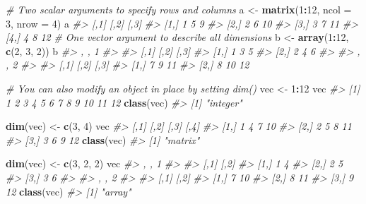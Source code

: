 \documentclass[]{book}
\newenvironment{Shaded}{\begin{snugshade}}{\end{snugshade}}
\newcommand{\CommentTok}[1]{\textcolor[rgb]{0.56,0.35,0.01}{\textit{#1}}}
\newcommand{\DataTypeTok}[1]{\textcolor[rgb]{0.13,0.29,0.53}{#1}}
\newcommand{\DecValTok}[1]{\textcolor[rgb]{0.00,0.00,0.81}{#1}}
\newcommand{\KeywordTok}[1]{\textcolor[rgb]{0.13,0.29,0.53}{\textbf{#1}}}
\newcommand{\NormalTok}[1]{#1}
\newcommand{\OperatorTok}[1]{\textcolor[rgb]{0.81,0.36,0.00}{\textbf{#1}}}
\newcommand{\StringTok}[1]{\textcolor[rgb]{0.31,0.60,0.02}{#1}}
\theoremstyle{definition}
\theoremstyle{definition}
\theoremstyle{definition}
\theoremstyle{remark}
\begin{document}
\begin{Shaded}
\begin{Highlighting}[]
\CommentTok{# Two scalar arguments to specify rows and columns}
\NormalTok{a <-}\StringTok{ }\KeywordTok{matrix}\NormalTok{(}\DecValTok{1}\OperatorTok{:}\DecValTok{12}\NormalTok{, }\DataTypeTok{ncol =} \DecValTok{3}\NormalTok{, }\DataTypeTok{nrow =} \DecValTok{4}\NormalTok{)}
\NormalTok{a}
\CommentTok{#>      [,1] [,2] [,3]}
\CommentTok{#> [1,]    1    5    9}
\CommentTok{#> [2,]    2    6   10}
\CommentTok{#> [3,]    3    7   11}
\CommentTok{#> [4,]    4    8   12}
\CommentTok{# One vector argument to describe all dimensions}
\NormalTok{b <-}\StringTok{ }\KeywordTok{array}\NormalTok{(}\DecValTok{1}\OperatorTok{:}\DecValTok{12}\NormalTok{, }\KeywordTok{c}\NormalTok{(}\DecValTok{2}\NormalTok{, }\DecValTok{3}\NormalTok{, }\DecValTok{2}\NormalTok{))}
\NormalTok{b}
\CommentTok{#> , , 1}
\CommentTok{#> }
\CommentTok{#>      [,1] [,2] [,3]}
\CommentTok{#> [1,]    1    3    5}
\CommentTok{#> [2,]    2    4    6}
\CommentTok{#> }
\CommentTok{#> , , 2}
\CommentTok{#> }
\CommentTok{#>      [,1] [,2] [,3]}
\CommentTok{#> [1,]    7    9   11}
\CommentTok{#> [2,]    8   10   12}

\CommentTok{# You can also modify an object in place by setting dim()}
\NormalTok{vec <-}\StringTok{ }\DecValTok{1}\OperatorTok{:}\DecValTok{12}
\NormalTok{vec}
\CommentTok{#>  [1]  1  2  3  4  5  6  7  8  9 10 11 12}
\KeywordTok{class}\NormalTok{(vec)}
\CommentTok{#> [1] "integer"}

\KeywordTok{dim}\NormalTok{(vec) <-}\StringTok{ }\KeywordTok{c}\NormalTok{(}\DecValTok{3}\NormalTok{, }\DecValTok{4}\NormalTok{)}
\NormalTok{vec}
\CommentTok{#>      [,1] [,2] [,3] [,4]}
\CommentTok{#> [1,]    1    4    7   10}
\CommentTok{#> [2,]    2    5    8   11}
\CommentTok{#> [3,]    3    6    9   12}
\KeywordTok{class}\NormalTok{(vec)}
\CommentTok{#> [1] "matrix"}

\KeywordTok{dim}\NormalTok{(vec) <-}\StringTok{ }\KeywordTok{c}\NormalTok{(}\DecValTok{3}\NormalTok{, }\DecValTok{2}\NormalTok{, }\DecValTok{2}\NormalTok{)}
\NormalTok{vec}
\CommentTok{#> , , 1}
\CommentTok{#> }
\CommentTok{#>      [,1] [,2]}
\CommentTok{#> [1,]    1    4}
\CommentTok{#> [2,]    2    5}
\CommentTok{#> [3,]    3    6}
\CommentTok{#> }
\CommentTok{#> , , 2}
\CommentTok{#> }
\CommentTok{#>      [,1] [,2]}
\CommentTok{#> [1,]    7   10}
\CommentTok{#> [2,]    8   11}
\CommentTok{#> [3,]    9   12}
\KeywordTok{class}\NormalTok{(vec)}
\CommentTok{#> [1] "array"}
\end{Highlighting}
\end{Shaded}
\end{document}
